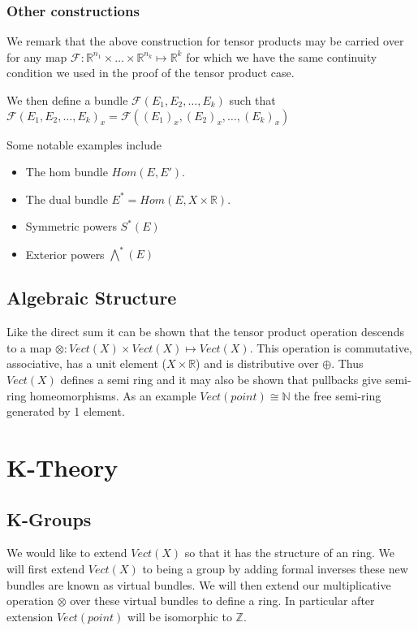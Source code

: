 \documentclass[a4paper,10pt]{article}
\theoremstyle{plain}%
\theoremstyle{definition}
\theoremstyle{remark}
\newcommand{\NN}{\mathbb{N}}
\newcommand{\ZZ}{\mathbb{Z}}
\newcommand{\RR}{\mathbb{R}}
\begin{document}
\subsubsection{Other constructions}

We remark that the above construction for tensor products may be carried over for any map $\mathcal{F}:\RR^{n_1}\times\ldots\times\RR^{n_k}\mapsto\RR^k$
for which we have the same continuity condition we used in the proof of the tensor product case.


We then define a bundle $\mathcal{F}(E_1,E_2,\ldots,E_k)$ such that $\mathcal{F}(E_1,E_2,\ldots,E_k)_x = \mathcal{F}((E_1)_x,(E_2)_x,\ldots,(E_k)_x)$

Some notable examples include
\begin{itemize}
 \item The hom bundle $Hom(E,E')$.
 \item The dual bundle $E^\ast = Hom(E,X\times\RR)$.
 \item Symmetric powers $S^\ast(E)$
 \item Exterior powers $\bigwedge^\ast(E)$
\end{itemize}

\subsection{Algebraic Structure}

Like the direct sum it can be shown that the tensor product operation descends to a map 
$\otimes:Vect(X)\times Vect(X)\mapsto Vect(X)$. This operation is commutative, associative, has a unit element
($X\times\RR$) and is distributive over $\oplus$. Thus $Vect(X)$ defines a semi ring and it may also be shown that
pullbacks give semi-ring homeomorphisms. As an example $Vect(point)\cong\NN$ the free semi-ring generated by 1 element.


\section{K-Theory}

\subsection{K-Groups}

We would like to extend $Vect(X)$ so that it has the structure of an ring. We will first extend $Vect(X)$ to being a
group by adding formal inverses these new bundles are known as virtual bundles. We will then extend our multiplicative
operation $\otimes$ over these virtual bundles to define a ring. In particular after extension $Vect(point)$ will be 
isomorphic to $\ZZ$.
\end{document}
